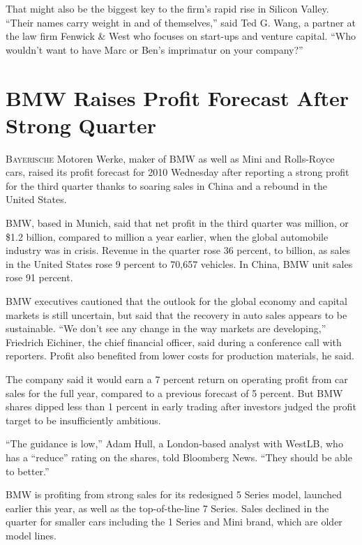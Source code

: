 ﻿\documentclass[12pt]{article}
\begin{document}
That might also be the biggest key to the firm's rapid rise in Silicon Valley. ``Their names carry
weight in and of themselves,'' said Ted G. Wang, a partner at the law firm Fenwick \& West who
focuses on start-ups and venture capital. ``Who wouldn't want to have Marc or Ben's imprimatur on
your company?''

\section{BMW Raises Profit Forecast After Strong Quarter}

\lettrine{B}{ayerische} Motoren Werke, maker of BMW as well as Mini and
Rolls-Royce cars, raised its profit forecast for 2010 Wednesday after reporting a strong profit for
the third quarter thanks to soaring sales in China and a rebound in the United States.

BMW, based in Munich, said that net profit in the third quarter was  million, or \$1.2
billion, compared to  million a year earlier, when the global automobile industry was in
crisis. Revenue in the quarter rose 36 percent, to  billion, as sales in the United
States rose 9 percent to 70,657 vehicles. In China, BMW unit sales rose 91 percent.

BMW executives cautioned that the outlook for the global economy and capital markets is still
uncertain, but said that the recovery in auto sales appears to be sustainable. ``We don't see any
change in the way markets are developing,'' Friedrich Eichiner, the chief financial officer, said
during a conference call with reporters. Profit also benefited from lower costs for production
materials, he said.

The company said it would earn a 7 percent return on operating profit from car sales for the full
year, compared to a previous forecast of 5 percent. But BMW shares dipped less than 1 percent in
early trading after investors judged the profit target to be insufficiently ambitious.

``The guidance is low,'' Adam Hull, a London-based analyst with WestLB, who has a ``reduce'' rating
on the shares, told Bloomberg News. ``They should be able to better.''

BMW is profiting from strong sales for its redesigned 5 Series model, launched earlier this year, as
well as the top-of-the-line 7 Series. Sales declined in the quarter for smaller cars including the 1
Series and Mini brand, which are older model lines.
\end{document}
